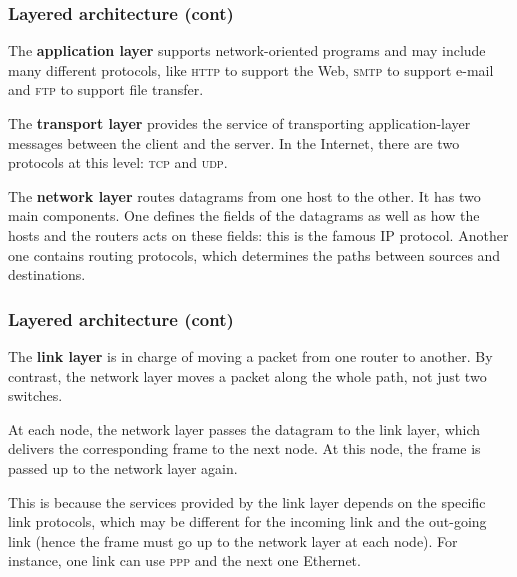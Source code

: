 %
\begin{frame}
\frametitle{Layered architecture (cont)}

The \textbf{application layer} supports network-oriented programs
and may include many different protocols, like \textsc{http} to
support the Web, \textsc{smtp} to support e-mail and \textsc{ftp} to
support file transfer.

\bigskip

The \textbf{transport layer} provides the service of transporting
application-layer messages between the client and the server. In the
Internet, there are two protocols at this level: \textsc{tcp} and
\textsc{udp}.

\bigskip

The \textbf{network layer} routes datagrams from one host to the
other. It has two main components. One defines the fields of the
datagrams as well as how the hosts and the routers acts on these
fields: this is the famous \textsc{IP} protocol. Another one contains
routing protocols, which determines the paths between sources and
destinations.

\end{frame}

%
\begin{frame}
\frametitle{Layered architecture (cont)}

The \textbf{link layer} is in charge of moving a packet from one
router to another. By contrast, the network layer moves a packet
along the whole path, not just two switches.

\bigskip

At each node, the network layer passes the datagram to the link
layer, which delivers the corresponding frame to the next node. At
this node, the frame is passed up to the network layer again.

\bigskip

This is because the services provided by the link layer depends on the
specific link protocols, which may be different for the incoming link
and the out-going link (hence the frame must go up to the network
layer at each node). For instance, one link can use \textsc{ppp} and
the next one Ethernet.

\end{frame}

